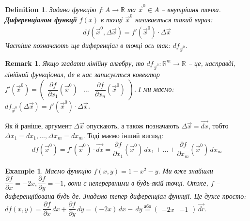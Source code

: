 \documentclass[a4paper, 10pt]{article}
\def\departial#1#2{\dfrac{\partial {#1}}{\partial {#2}}}
\theoremstyle{theoremdd}
\theoremstyle{theoremdd}
\theoremstyle{theoremdd}
\newtheorem{definition}[theorem]{Definition}
\theoremstyle{theoremdd}
\theoremstyle{theoremdd}
\newtheorem{example}[theorem]{Example}
\theoremstyle{theoremdd}
\theoremstyle{theoremdd}
\newtheorem{remark}[theorem]{Remark}
\theoremstyle{theoremdd}
\theoremstyle{theoremdd}
\begin{document}
\begin{definition}
Задано функцію $f\colon A \to \mathbb{R}$ та $\vec{x}^0 \in A$ -- внутрішня точка.\\
\textbf{Диференціалом функції} $f(x)$ в точці $\vec{x}^0$ називається такий вираз:
\begin{align*}
df(\vec{x}^0, \Delta \vec{x}) = f'(\vec{x}^0) \cdot \Delta \vec{x}
\end{align*}
Частіше позначають ще диференціал в точці ось так: $df_{\vec{x}^0}$.
\end{definition}

\begin{remark}
Якщо згадати лінійну алгебру, то $df_{\vec{x}^0} \colon \mathbb{R}^m \to \mathbb{R}$ -- це, насправді, лінійний функціонал, де в нас записується ковектор $f'(\vec{x}^0) = \begin{pmatrix}
\departial{f}{x_1}(\vec{x}^0) & \dots & \departial{f}{x_n}(\vec{x}^0)
\end{pmatrix}$. І ми маємо:\\
$df_{\vec{x}^0} (\Delta \vec{x}) = f'(\vec{x}^0) \cdot \Delta \vec{x}$.
\end{remark}

Як й раніше, аргумент $\Delta \vec{x}$ опускають, а також позначають $\Delta \vec{x}= \vec{dx}$, тобто $\Delta x_1 = dx_1, \dots, \Delta x_m = dx_m$. Тоді маємо інший вигляд:
\begin{align*}
df(\vec{x}^0) = f'(\vec{x}^0) \cdot \vec{dx} = \departial{f}{x_1}(\vec{x}^0)\,dx_1 + \dots + \departial{f}{x_m}(\vec{x}^0)\,dx_m
\end{align*}

\begin{example}
Маємо функцію $f(x,y) = 1-x^2 - y$. Ми вже знайшли $\departial{f}{x} = -2x, \departial{f}{y} = -1$, вони є неперервними в будь-якій точці. Отже, $f$ -- диференційована будь-де. Знадемо тепер диференціал функції. Це дуже просто:\\
$d f(x,y) = \departial{f}{x}\,dx + \departial{f}{y}\,dy = (-2x)\,dx -\,dy \overset{\text{або}}{=} \begin{pmatrix}
-2x & -1
\end{pmatrix} \, \vec{dr}$.
\end{example}
\end{document}

